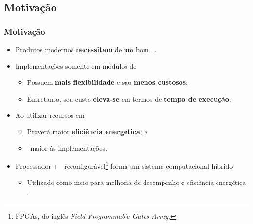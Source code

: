    \subsection{Motivação}
      \begin{frame} \vspace{-1em}
         \frametitle{Motivação}
         \begin{itemize} \setlength{\itemsep}{1.2em}
            \item Produtos modernos \textbf{necessitam} de um bom \codesign\ \cite{Trappey2016}. 
            
            \item Implementações somente em módulos de \software
            \begin{itemize}
               \item Possuem \textbf{mais flexibilidade} e são \textbf{menos custosos};
               \item Entretanto, seu custo \textbf{eleva-se} em termos de \textbf{tempo de execução};
            \end{itemize}
           
            \item Ao utilizar recursos em \hardware\ \cite{Zhang2008, Hassine2017, Wolf1994, Canis2011, Stone2010}
            \begin{itemize}
               \item Proverá maior \textbf{eficiência energética}; e 
               \item \textbf{\Speedup}\ maior às implementações.
            \end{itemize}
            
                  
            \item Processador + \hardware\ reconfigurável\footnote{FPGAs, do inglês \textit{Field-Programmable Gates Array}.} forma um sistema computacional híbrido
            
            \begin{itemize}
               \item Utilizado como meio para melhoria de desempenho e eficiência energética \cite{Cong2009, Lo2009, Zhang2008a}. 
            \end{itemize}
            
         \end{itemize}
         
      \end{frame}
   

